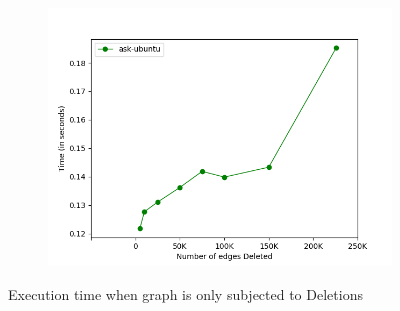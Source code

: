 \documentclass[a4paper]{article}
\begin{document}
\begin{figure}[H]
\begin{subfigure}[b]{0.32\textwidth}
         \caption{}
         \label{fig:deletion_trend_2}
    \end{subfigure}
    \hfill
    \begin{subfigure}[b]{0.32\textwidth}
         \centering
         \includegraphics[width=\textwidth]{img/del/d3.png}
         \caption{}
         \label{fig:deletion_trend_3}
    \end{subfigure}
    \caption{Execution time when graph is only subjected to Deletions}
    \label{fig:deletion_trend}
\end{figure}
\end{document}
